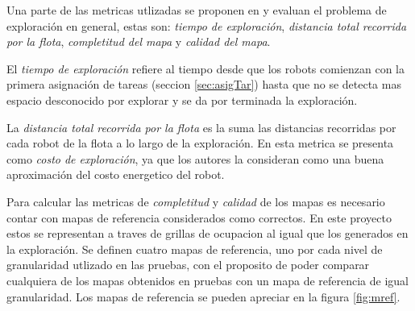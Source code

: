 Una parte de las metricas utlizadas se proponen en \cite{yan2015metrics} y
evaluan el problema de exploración en general, estas son: \emph{tiempo de
exploración}, \emph{distancia total recorrida por la flota}, \emph{completitud
del mapa} y \emph{calidad del mapa}. 

El \emph{tiempo de exploración} refiere al tiempo desde que los robots
comienzan con la primera asignación de tareas (seccion \ref{sec:asigTar}) hasta
que no se detecta mas espacio desconocido por explorar y se da por terminada la exploración.

La \emph{distancia total recorrida por la flota} es la suma las distancias
recorridas por cada robot de la flota a lo largo de la exploración. En
\cite{yan2015metrics} esta metrica se presenta como \emph{costo de
exploración}, ya que los autores la consideran como una buena aproximación del
costo energetico del robot. 


Para calcular las metricas de \emph{completitud} y \emph{calidad} de los mapas
es necesario contar con mapas de referencia considerados como correctos. En
este proyecto estos se representan a traves de grillas de ocupacion al igual
que los generados en la exploración. Se definen cuatro mapas de
referencia, uno por cada nivel de granularidad utlizado en las pruebas, con el
proposito de poder comparar cualquiera de los mapas obtenidos en pruebas con
un mapa de referencia de igual granularidad. Los mapas de referencia se pueden
apreciar en la figura \ref{fig:mref}. 

